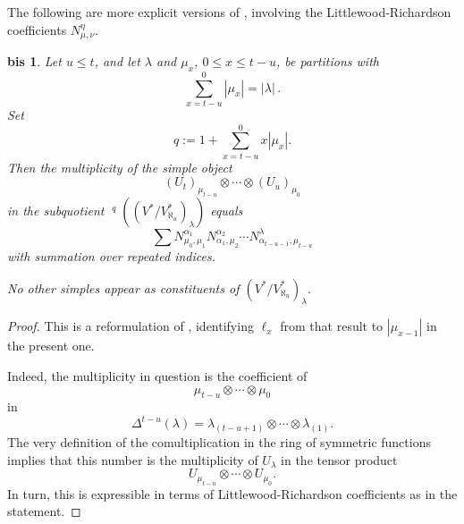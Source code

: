 \documentclass[11pt]{article}
\theoremstyle{plain}
\theoremstyle{nonumberplain}
\newtheorem{qfbis}{\Cref{le.quot_filt} bis}
\theoremstyle{plain}
\theoremstyle{nonumberplain}
\newtheorem{proof}{Proof}
\newcommand\al{\aleph}
\DeclareMathOperator{\usoc}{\underline{\mathrm{soc}}}
\begin{document}
 








The following are more explicit versions of , involving the Littlewood-Richardson coefficients $N_{\mu,\nu}^\eta$.  




\begin{qfbis}
 Let $u\leq t$, and let $\lambda$ and $\mu_x$, $0\le x\le t-u$, be partitions with
\begin{equation*}
\sum^{0}_{x=t-u}|\mu_x|=|\lambda|\,.
\end{equation*}
Set
\begin{equation*}
q:=1+\sum^{0}_{x=t-u}x|\mu_x|.  
\end{equation*}
Then the multiplicity of the simple object
\begin{equation*}
(U_t)_{\mu_{t-u}}\otimes\cdots\otimes (U_u)_{\mu_0}
\end{equation*}
 in the subquotient $\usoc^q((V^*/V^*_{\al_u})_\lambda)$  equals
  \begin{equation*}
    \sum N_{\mu_0,\mu_1}^{\alpha_1} N_{\alpha_1,\mu_2}^{\alpha_2}\cdots N_{\alpha_{t-u-1},\mu_{t-u}}^{\lambda}
  \end{equation*}
  with summation over repeated indices.



No other simples appear as constituents of $(V^*/V^*_{\al_u})_\lambda$. 
\end{qfbis}
\begin{proof}
  This is a reformulation of , identifying $\ell_x$
  from that result to $|\mu_{x-1}|$ in the present one.

  Indeed, the multiplicity in question is the coefficient of
  \begin{equation*}
    \mu_{t-u}\otimes\cdots\otimes \mu_{0} 
  \end{equation*}
  in
  \begin{equation*}
    \Delta^{t-u}(\lambda)=\lambda_{(t-u+1)}\otimes\cdots\otimes \lambda_{(1)}. 
  \end{equation*}
  The very definition of the comultiplication in the ring of symmetric
  functions implies that this number is the multiplicity of
  $U_\lambda$ in the tensor product
  \begin{equation*}
    U_{\mu_{t-u}}\otimes\cdots\otimes U_{\mu_{0}}.
  \end{equation*}
  In turn, this is expressible in terms of Littlewood-Richardson
  coefficients as in the statement.
\end{proof}
\end{document}
